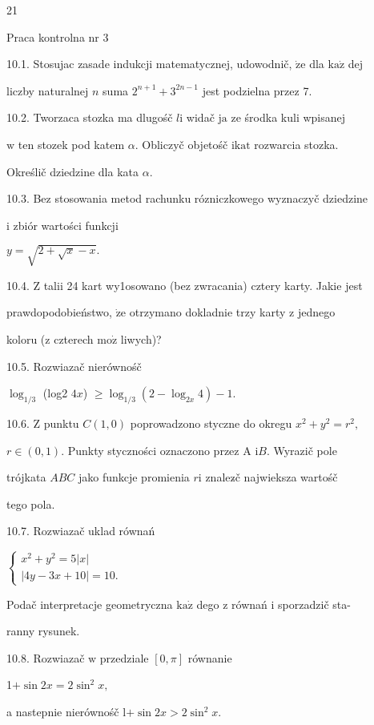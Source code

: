 \documentclass[a4paper,12pt]{article}
\begin{document}
21

Praca kontrolna nr 3

10.1. Stosujac zasade indukcji matematycznej, udowodnič, $\dot{\mathrm{z}}\mathrm{e}$ dla $\mathrm{k}\mathrm{a}\dot{\mathrm{z}}$ dej

liczby naturalnej $n$ suma $2^{n+1}+3^{2n-1}$ jest podzielna przez 7.

10.2. Tworzaca stozka ma dlugośč $l \mathrm{i}$ widač $\mathrm{j}\mathrm{a}$ ze środka kuli wpisanej

$\mathrm{w}$ ten stozek pod katem $\alpha$. Obliczyč objetośč $\mathrm{i}\mathrm{k}\mathrm{a}\mathrm{t}$ rozwarcia stozka.

Określič dziedzine dla kata $\alpha.$

10.3. Bez stosowania metod rachunku rózniczkowego wyznaczyč dziedzine

$\mathrm{i}$ zbiór wartości funkcji

$y=\sqrt{2+\sqrt{x}-x}.$

10.4. $\mathrm{Z}$ talii 24 kart wy1osowano (bez zwracania) cztery karty. Jakie jest

prawdopodobieństwo, $\dot{\mathrm{z}}\mathrm{e}$ otrzymano dokladnie trzy karty $\mathrm{z}$ jednego

koloru ($\mathrm{z}$ czterech $\mathrm{m}\mathrm{o}\dot{\mathrm{z}}$ liwych)?

10.5. Rozwiazač nierównośč

$\log_{1/3}$ (log2 $4x$) $\geq\log_{1/3}(2-\log_{2x}4)-1.$

10.6. $\mathrm{Z}$ punktu $C(1,0)$ poprowadzono styczne do okregu $x^{2}+y^{2} = r^{2},$

$ r\in (0,1)$. Punkty styczności oznaczono przez A $\mathrm{i}B$. Wyrazič pole

trójkata $ABC$ jako funkcje promienia $r\mathrm{i}$ znalez$\acute{}$č najwieksza wartośč

tego pola.

10.7. Rozwiazač uklad równań

$\left\{\begin{array}{l}
x^{2}+y^{2}=5|x|\\
|4y-3x+10|=10.
\end{array}\right.$

Podač interpretacje geometryczna $\mathrm{k}\mathrm{a}\dot{\mathrm{z}}$ dego $\mathrm{z}$ równań $\mathrm{i}$ sporzadzič sta-

ranny rysunek.

10.8. Rozwiazač $\mathrm{w}$ przedziale $[0,\pi]$ równanie

1$+ \sin 2x=2\sin^{2}x,$

a nastepnie nierównośč l$+ \sin 2x>2\sin^{2}x.$
\end{document}
